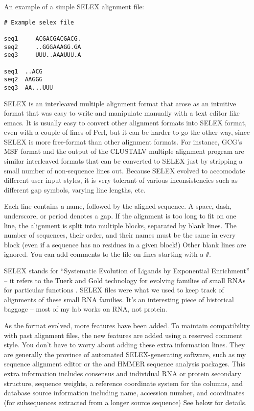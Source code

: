 An example of a simple SELEX alignment file:

\begin{verbatim}
# Example selex file

seq1     ACGACGACGACG.
seq2     ..GGGAAAGG.GA
seq3     UUU..AAAUUU.A

seq1  ..ACG
seq2  AAGGG
seq3  AA...UUU
\end{verbatim}

SELEX is an interleaved multiple alignment format that arose as an
intuitive format that was easy to write and manipulate manually with a
text editor like emacs. It is usually easy to convert other alignment
formats into SELEX format, even with a couple of lines of Perl, but it
can be harder to go the other way, since SELEX is more free-format
than other alignment formats. For instance, GCG's MSF format and the
output of the CLUSTALV multiple alignment program are similar
interleaved formats that can be converted to SELEX just by stripping a
small number of non-sequence lines out. Because SELEX evolved to
accomodate different user input styles, it is very tolerant of various
inconsistencies such as different gap symbols, varying line lengths,
etc.

Each line contains a name, followed by the aligned sequence. A space,
dash, underscore, or period denotes a gap. If the alignment is too
long to fit on one line, the alignment is split into multiple blocks,
separated by blank lines. The number of sequences, their order, and
their names must be the same in every block (even if a sequence has no
residues in a given block!) Other blank lines are ignored. You can add
comments to the file on lines starting with a \verb+#+.

SELEX stands for ``Systematic Evolution of Ligands by Exponential
Enrichment'' -- it refers to the Tuerk and Gold technology for
evolving families of small RNAs for particular functions
\cite{Tuerk90b}. SELEX files were what we used to keep track of
alignments of these small RNA families. It's an interesting piece of
historical baggage -- most of my lab works on RNA, not protein.

As the format evolved, more features have been added. To maintain
compatibility with past alignment files, the new features are added
using a reserved comment style. You don't have to worry about adding
these extra information lines. They are generally the province of
automated SELEX-generating software, such as my  sequence
alignment editor or the  and HMMER sequence analysis
packages. This extra information includes consensus and individual RNA
or protein secondary structure, sequence weights, a reference
coordinate system for the columns, and database source information
including name, accession number, and coordinates (for subsequences
extracted from a longer source sequence) See below for details.

